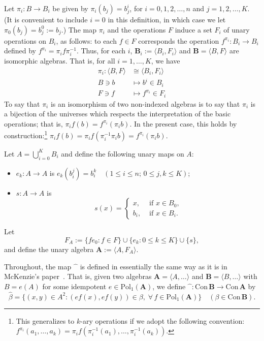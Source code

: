 \documentclass[cm,dissertation,actual,final]{uhthesis}
\theoremstyle{plain}
\theoremstyle{definition}
\theoremstyle{remark}
\numberwithin{theorem}{section}
\numberwithin{claim}{chapter}
\numberwithin{equation}{section}
\numberwithin{conjecture}{chapter}
\newcommand{\<}{\ensuremath{\langle}}
\renewcommand{\>}{\ensuremath{\rangle}}
\renewcommand{\leq}{\ensuremath{\leqslant}}
\newcommand{\Con}{\ensuremath{\mathrm{Con\,}}}
\newcommand{\Pol}{\ensuremath{\mathrm{Pol}}}
\newcommand{\supi}{\ensuremath{^{i}}}
\newcommand{\0}{\ensuremath{\mathbf{0}}}
\newcommand{\1}{\ensuremath{\mathbf{1}}}
\newcommand{\2}{\ensuremath{\mathbf{2}}}
\newcommand{\3}{\ensuremath{\mathbf{3}}}
\newcommand{\4}{\ensuremath{\mathbf{4}}}
\newcommand{\5}{\ensuremath{\mathbf{5}}}
\newcommand{\bA}{\ensuremath{\mathbf{A}}}
\newcommand{\bB}{\ensuremath{\mathbf{B}}}
\newcommand{\hatmap}{\ensuremath{\widehat{\phantom{x}}}}
\begin{document}
Let $\pi_i: B\rightarrow B_{i}$ be given by $\pi_i(b_j) = b_j^{i}$, for
$i=0, 1, 2, \dots, n$ and $j=1, 2, \dots, K$.  (It is
convenient to include $i=0$ in this definition, in which case we let 
$\pi_0(b_j) = b_j^{0} := b_j$.) 
The map $\pi_i$ and the operations $F$ induce a set $F_{i}$ of
unary operations on $B_i$, as follows:
to each $f\in F$ corresponds the operation $f^{\pi_i} : B_i \rightarrow B_i$
defined by $f^{\pi_i} = \pi_i f \pi_i^{-1}$.
Thus, for each $i$, $\bB_i := \<B_i, F_i\>$ 
and $\bB = \<B, F\>$ are isomorphic  algebras.
That is, for all $i=1,\dots, K$, we have 
\begin{align*}
  \pi_i :   \<B, F\> &\cong \< B_i, F_i\>\\
  B\ni b & \mapsto  b\supi \in B_i\\
  F\ni f &\mapsto f^{\pi_i} \in F_i
\end{align*}
To say that $\pi_i$ is an isomorphism of two non-indexed algebras
is to say that $\pi_i$ is a bijection of the universes which respects the
interpretation of the basic operations; that is, 
$\pi_if(b)= f^{\pi_i}(\pi_i b)$.  In the present case, this holds by
construction:\footnote{
  This generalizes to $k$-ary operations if we 
  adopt the following convention: $f^{\pi_i}(a_1,\dots, a_k) =
  \pi_if(\pi_i^{-1}(a_1), \dots, \pi_i^{-1}(a_k))$.}
$\pi_if(b) = \pi_i f(\pi_i^{-1}\pi_i b) = f^{\pi_i}(\pi_i b)$.

Let $A = \bigcup_{i=0}^K B_i$ and define the following unary maps on $A$:
\begin{itemize}
\item  $e_k: A\rightarrow A$ is $e_k(b_i^j)
  = b_i^k \quad (1 \leq i \leq n;\, 0\leq j, k \leq K)$;
\item $s:A\rightarrow A$ is 
  \[
  s(x) = 
  \begin{cases}
    x, & \text{ if $x\in B_0$,}\\
    b_i, & \text{ if $x\in B_i$.}
  \end{cases}
  \]
\end{itemize}
Let 
\[
F_A := \{f e_0 : f\in F\} \cup \{e_k : 0\leq k \leq K\} \cup \{s\},
\] 
and define the unary algebra $\bA := \< A, F_A\>$.  

Throughout, the map $\hatmap$ is defined
in essentially the same way as it is in McKenzie's paper~\cite{McKenzie:1983}.
That is, given two algebras $\bA = \< A, \dots\>$ 
and $\bB = \< B, \dots\>$ with $B = e(A)$ for some idempotent
$e \in \Pol_1(\bA)$,  we define
$\hatmap : \Con\bB \rightarrow \Con\bA$ by
\[
\widehat{\beta} = \{(x,y) \in A^2 : (ef(x), ef(y))\in \beta, \; \forall\,
f\in \Pol_1(\bA) \} \quad (\beta \in \Con\bB).
\]
\end{document}
